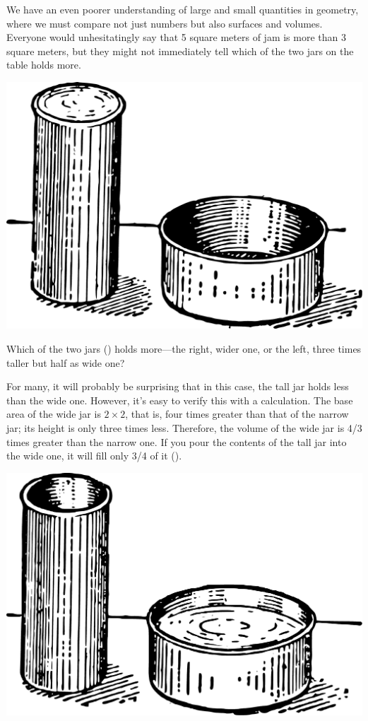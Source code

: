We have an even poorer understanding of large and small quantities in geometry, where we must compare not just numbers but also surfaces and volumes. Everyone would unhesitatingly say that 5 square meters of jam is more than 3 square meters, but they might not immediately tell which of the two jars on the table holds more.
\begin{marginfigure}%
\centering
\includegraphics[width=\textwidth]{figures/ch-11/fig-165.pdf}
\end{marginfigure}

\ques Which of the two jars () holds more—the right, wider one, or the left, three times taller but half as wide one?

\ans For many, it will probably be surprising that in this case, the tall jar holds less than the wide one. However, it’s easy to verify this with a calculation. The base area of the wide jar is $2 \times 2$, that is, four times greater than that of the narrow jar; its height is only three times less. Therefore, the volume of the wide jar is 4/3 times greater than the narrow one. If you pour the contents of the tall jar into the wide one, it will fill only 3/4 of it ().


\begin{marginfigure}[-1cm]%
\centering
\includegraphics[width=\textwidth]{figures/ch-11/fig-166.pdf}
\end{marginfigure}



